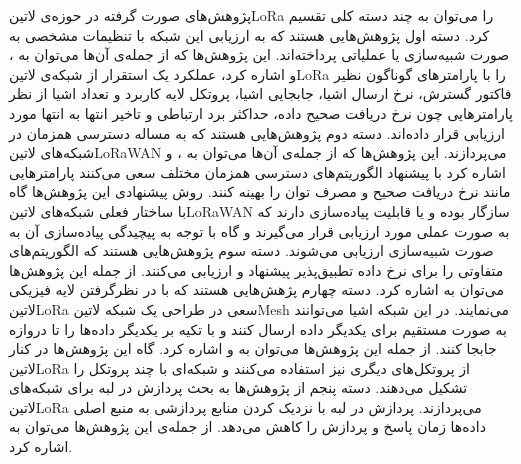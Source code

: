 پژوهش‌های صورت گرفته در حوزه‌ی ‌لاتین{LoRa} را می‌توان به چند دسته کلی تقسیم کرد. دسته اول پژوهش‌هایی هستند که به ارزیابی این شبکه با تنظیمات مشخصی
به صورت شبیه‌سازی یا عملیاتی پرداخته‌اند. این پژوهش‌ها که از جمله‌ی آن‌ها می‌توان به ،  و 
اشاره کرد، عملکرد یک استقرار از شبکه‌ی ‌لاتین{LoRa}
را با پارامترهای گوناگون نظیر فاکتور گسترش، نرخ ارسال اشیا، جابجایی اشیا، پروتکل لایه کاربرد و تعداد اشیا
از نظر پارامترهایی چون نرخ دریافت صحیح داده، حداکثر برد ارتباطی و تاخیر انتها به انتها
مورد ارزیابی قرار داده‌اند.
دسته دوم پژوهش‌هایی هستند که به مساله دسترسی همزمان در شبکه‌های ‌لاتین{LoRaWAN} می‌پردازند. این پژوهش‌ها که از جمله‌ی آن‌ها می‌توان به ،  و 
اشاره کرد با پیشنهاد الگوریتم‌های دسترسی همزمان مختلف سعی می‌کنند پارامترهایی مانند نرخ دریافت صحیح و مصرف توان را بهینه کنند. روش پیشنهادی این پژوهش‌ها گاه با ساختار فعلی
شبکه‌های ‌لاتین{LoRaWAN} سازگار بوده و یا قابلیت پیاده‌سازی دارند که به صورت عملی مورد ارزیابی قرار می‌گیرند و گاه با توجه به پیچیدگی پیاده‌سازی آن به صورت شبیه‌سازی ارزیابی می‌شوند.
دسته سوم پژوهش‌هایی هستند که الگوریتم‌های متفاوتی را برای نرخ داده تطبیق‌پذیر پیشنهاد و ارزیابی می‌کنند. از جمله این پژوهش‌ها می‌توان به  اشاره کرد.
دسته چهارم پژهش‌هایی هستند که با در نظرگرفتن لایه فیزیکی ‌لاتین{LoRa} سعی در طراحی یک شبکه ‌لاتین{Mesh} می‌نمایند. در این شبکه اشیا می‌توانند
به صورت مستقیم برای یکدیگر داده ارسال کنند و با تکیه بر یکدیگر داده‌ها را تا دروازه جابجا کنند. از جمله این پژوهش‌ها می‌توان به  و 
اشاره کرد.
گاه این پژوهش‌ها در کنار ‌لاتین{LoRa} از پروتکل‌های دیگری نیز استفاده می‌کنند و شبکه‌ای با چند پروتکل را تشکیل می‌دهند.
دسته پنجم از پژوهش‌ها به بحث پردازش در لبه برای شبکه‌های ‌لاتین{LoRa} می‌پردازند. پردازش در لبه با نزدیک کردن منابع پردازشی به منبع اصلی داده‌ها زمان پاسخ و پردازش را کاهش می‌دهد.
از جمله‌ی این پژوهش‌ها می‌توان به  اشاره کرد.

